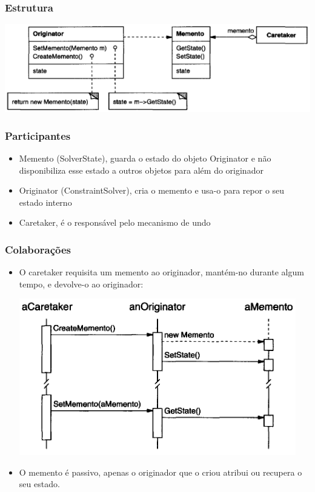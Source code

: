 \subsubsection{Estrutura}

\centerline{\includegraphics[scale=.7]{img/memento/structure.png}}

\subsubsection{Participantes}
\begin{itemize}
\item Memento (SolverState), guarda o estado do objeto Originator e não disponibiliza esse estado a outros objetos para além do originador
\item Originator (ConstraintSolver), cria o memento e usa-o para repor o seu estado interno
\item Caretaker, é o responsável pelo mecanismo de undo
\end{itemize}

\subsubsection{Colaborações}

\begin{itemize}
\item O caretaker requisita um memento ao originador, mantém-no durante algum tempo, e devolve-o ao originador:

\centerline{\includegraphics[scale=.7]{img/memento/caretaker.png}}

\item O memento é passivo, apenas o originador que o criou atribui ou recupera o seu estado.
\end{itemize}

